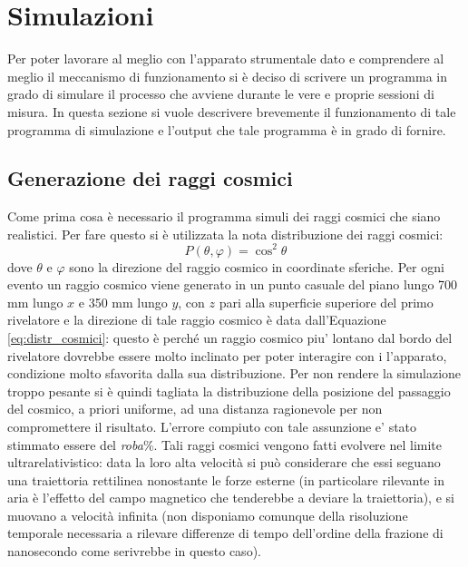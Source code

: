 \section{Simulazioni}
Per poter lavorare al meglio con l'apparato strumentale dato e comprendere al meglio il meccanismo di funzionamento si è deciso di scrivere un programma in grado di simulare
il processo che avviene durante le vere e proprie sessioni di misura. In questa sezione si vuole descrivere brevemente il funzionamento di tale programma di simulazione e
l'output che tale programma è in grado di fornire.
\subsection{Generazione dei raggi cosmici}
Come prima cosa è necessario il programma simuli dei raggi cosmici che siano realistici. Per fare questo si è utilizzata la nota distribuzione dei raggi cosmici:
\begin{equation}
	P\left(\theta, \varphi\right) = \cos^2{\theta}
	\label{eq:distr_cosmici}
\end{equation}
dove $\theta$ e $\varphi$ sono la direzione del raggio cosmico in coordinate sferiche.
Per ogni evento un raggio cosmico viene generato in un punto casuale del piano lungo 700 mm lungo $x$ e 350 mm lungo $y$, con $z$ pari alla superficie superiore del primo rivelatore e la direzione di tale raggio cosmico è data dall'Equazione \ref{eq:distr_cosmici}: questo \`e perch\'e un raggio cosmico piu' lontano dal bordo del rivelatore dovrebbe essere molto inclinato per poter interagire con i l'apparato, condizione molto sfavorita dalla sua distribuzione. Per non rendere la simulazione troppo pesante si \`e quindi tagliata la distribuzione della posizione del passaggio del cosmico, a priori uniforme, ad una distanza ragionevole per non compromettere il risultato. L'errore compiuto con tale assunzione e' stato stimmato essere del \textit{roba}\%.
Tali raggi cosmici vengono fatti evolvere nel limite ultrarelativistico: data la loro alta velocità si può considerare che essi seguano una traiettoria rettilinea nonostante
le forze esterne (in particolare rilevante in aria è l'effetto del campo magnetico che tenderebbe a deviare la traiettoria), e si muovano a velocità infinita (non disponiamo comunque della risoluzione temporale necessaria a rilevare differenze di tempo dell'ordine della frazione di nanosecondo come serivrebbe in questo caso).

